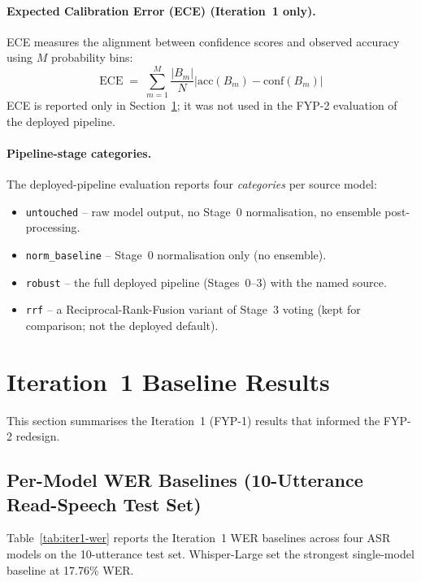 \paragraph{Expected Calibration Error (ECE) (Iteration~1 only).}
ECE measures the alignment between confidence scores and observed accuracy using $M$ probability bins:
\begin{equation}
\text{ECE} \;=\; \sum_{m=1}^{M} \frac{|B_m|}{N} \big| \text{acc}(B_m) - \text{conf}(B_m) \big|
\end{equation}
ECE is reported only in Section~\ref{sec:iter1-results}; it was not used in the FYP-2 evaluation of the deployed pipeline.

\paragraph{Pipeline-stage categories.}
The deployed-pipeline evaluation reports four \emph{categories} per source model:
\begin{itemize}
  \item \texttt{untouched} -- raw model output, no Stage~0 normalisation, no ensemble post-processing.
  \item \texttt{norm\_baseline} -- Stage~0 normalisation only (no ensemble).
  \item \texttt{robust} -- the full deployed pipeline (Stages~0--3) with the named source.
  \item \texttt{rrf} -- a Reciprocal-Rank-Fusion variant of Stage~3 voting (kept for comparison; not the deployed default).
\end{itemize}

\section{Iteration~1 Baseline Results}
\label{sec:iter1-results}

This section summarises the Iteration~1 (FYP-1) results that informed the FYP-2 redesign.

\subsection{Per-Model WER Baselines (10-Utterance Read-Speech Test Set)}
\label{ssec:iter1-wer}

Table~\ref{tab:iter1-wer} reports the Iteration~1 WER baselines across four ASR models on the 10-utterance test set. Whisper-Large set the strongest single-model baseline at 17.76\% WER.

